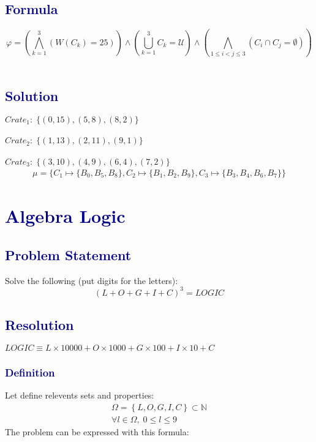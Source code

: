 \documentclass[12pt]{article}
\theoremstyle{definition}
\theoremstyle{plain}
\begin{document}
\subsection*{\textcolor{darkblue}{Formula}}
\begin{equation}
\varphi = \left(\bigwedge^3_{k=1}(W(C_k) = 25)\right)
         \wedge \left(\bigcup_{k=1}^3 C_k = \mathcal{U}\right)
         \wedge \left(\bigwedge_{1 \leq i < j \leq 3}(C_i \cap C_j = \emptyset)\right)
\end{equation}
\\

\subsection*{\textcolor{darkblue}{Solution}}
$Crate_1: \; \{(0, 15), (5,8), (8,2)\}$\\\\
$Crate_2: \; \{(1,13), (2,11), (9,1) \}$\\\\
$Crate_3: \; \{(3,10), (4,9), (6,4), (7,2) \}$
\[
\boxed{\begin{aligned}
\mu = \{C_1 \mapsto \{B_0, B_5, B_8\}, C_2 \mapsto \{B_1, B_2, B_9\}, C_3 \mapsto \{B_3, B_4, B_6, B_7 \}\}
\end{aligned}}
\]
\section*{\textcolor{darkblue}{Algebra Logic}}
\subsection*{\textcolor{darkblue}{Problem Statement}}

\vspace{0.5cm}
\begin{tcolorbox}[colback=lightgray, colframe=darkblue, boxrule=1pt]
Solve the following (put digits for the letters):
\begin{equation}
  (L + O + G + I + C)^3 = LOGIC
\end{equation}
\end{tcolorbox}
\subsection*{\textcolor{darkblue}{Resolution}}
$LOGIC \equiv L\times 10000 + O \times 1000 + G \times 100 + I\times 10 + C$
\subsubsection*{\textcolor{darkblue}{Definition}}
Let define relevents sets and properties:
\begin{align}
  \Omega = \left\{L, O, G, I, C \right\} \subset  \mathbb{N}\\
  \forall l \in \Omega, \; 0 \leq l \leq 9
\end{align}
\vspace{0.3cm}
\noindent
The problem can be expressed with this formula:
\end{document}
